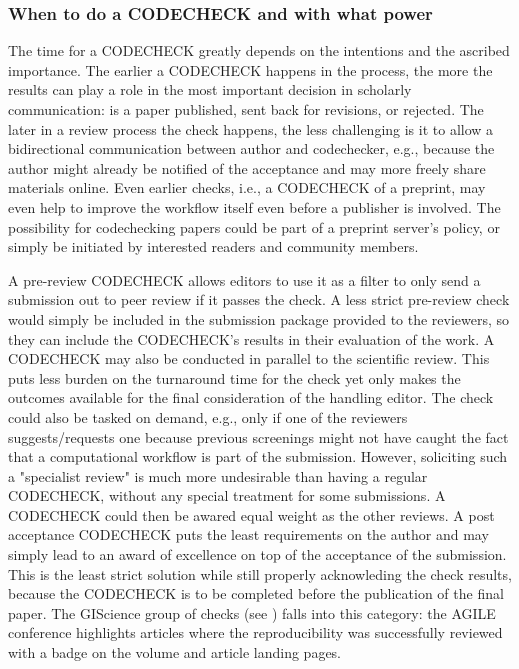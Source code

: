 \documentclass[12pt]{article}
\begin{document}
\subsubsection*{When to do a CODECHECK and with what power}
\label{when-to-do-a-codecheck}

The time for a CODECHECK greatly depends on the intentions and the ascribed
importance. The earlier a CODECHECK happens in the process, the more the
results can play a role in the most important decision in scholarly 
communication: is a paper published, sent back for revisions, or rejected.
The later in a review process the check happens, the less challenging is it
to allow a bidirectional communication between author and codechecker, e.g.,
because the author might already be notified of the acceptance and may more
freely share materials online.
Even earlier checks, i.e., a CODECHECK of a preprint, may even help to 
improve the workflow itself even before a publisher is involved. The 
possibility for codechecking papers could be part of a preprint server's
policy, or simply be initiated by interested readers and community members.

A pre-review CODECHECK allows editors to use it as a filter to only send 
a submission out to peer review if it passes the check. A less strict
pre-review check would simply be included in the submission package provided
to the reviewers, so they can include the CODECHECK's results in their 
evaluation of the work.
A CODECHECK may also be conducted in parallel to the scientific review. This
puts less burden on the turnaround time for the check yet only makes the 
outcomes available for the final consideration of the handling editor.
The check could also be tasked on demand, e.g., only if one of the reviewers
suggests/requests one because previous screenings might not have caught the 
fact that a computational workflow is part of the submission. However, 
soliciting such a "specialist review" is much more undesirable than having
a regular CODECHECK, without any special treatment for some submissions.
A CODECHECK could then be awared equal weight as the other reviews.
A post acceptance CODECHECK puts the least requirements on the author and may
simply lead to an award of excellence on top of the acceptance of the
submission. This is the least strict solution while still properly 
acknowleding the check results, because the CODECHECK is to be completed 
before the publication of the final paper.
The GIScience group of checks (see ) falls into this
category: the AGILE conference highlights articles where the reproducibility
was successfully reviewed with a badge on the volume and article landing
pages.
\end{document}
